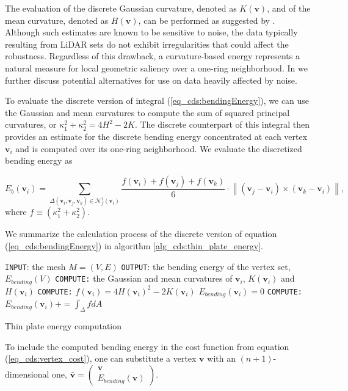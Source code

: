 \documentclass[graybox]{svmult}
\begin{document}
	
	The evaluation of the discrete Gaussian curvature, denoted as $K(\mathbf{v})$, and  of the mean curvature, denoted as $H(\mathbf{v})$, can be performed as suggested by \cite{Meyer2003}. Although such estimates are known to be sensitive to noise, the data typically resulting from LiDAR sets do not exhibit irregularities that could affect the robustness. Regardless of this drawback, a curvature-based energy represents a natural measure for local geometric saliency over a one-ring neighborhood. In \cite{Cioaca2016, Cioaca2016CEAI} we further discuss potential alternatives for use on data heavily affected by noise.
	
	To evaluate the discrete version of integral (\ref{eq_cds:bendingEnergy}), we can use the Gaussian and mean curvatures to compute the sum of squared principal curvatures, or $\kappa_1^2 + \kappa_2^2 = 4H^2 - 2K  $. The discrete counterpart of this integral then provides an estimate for the discrete bending energy concentrated at each vertex $\mathbf{v}_i$ and is computed over its one-ring neighborhood. We evaluate the discretized bending energy as 
	
	\begin{equation}
	\label{eq_cds:bendingEnergyDiscrete}
	E_{b}(\mathbf{{v}}_i) = \sum_{\Delta({\mathbf{{v}}_i,\mathbf{{v}}_j,\mathbf{{v}}_k}) \in \mathcal{N}_f^1(\mathbf{{v}}_i)} 
	\frac{f(\mathbf{{v}}_i) + f(\mathbf{{v}}_j) + f(\mathbf{{v}}_k)}{6} \cdot \left\lVert (\mathbf{{v}}_j - \mathbf{{v}}_i) \times (\mathbf{{v}}_k - \mathbf{{v}}_i) \right\rVert,
	\end{equation}
	where $f \equiv (\kappa_1^2 + \kappa_2^2)$.
	
	
	We summarize the calculation process of the discrete version of equation (\ref{eq_cds:bendingEnergy}) in algorithm \ref{alg_cds:thin_plate_energy}.
	
	\begin{algorithm}[t]
		\begin{algorithmic}
			\STATE \texttt{INPUT}: the mesh $M=(V,E)$
			\STATE \texttt{OUTPUT}: the bending energy of the vertex set, $E_{bending}(V)$
			\STATE \texttt{COMPUTE:} the Gaussian and mean curvatures of $\mathbf{v}_i$,
			$K(\mathbf{{v}}_i)$ and $H(\mathbf{{v}}_i)$
			\STATE \texttt{COMPUTE:} $f(\mathbf{v}_i) = 4H(\mathbf{{v}}_i)^2 - 2K(\mathbf{{v}}_i)$ 
			\ENDFOR
			\STATE $E_{bending}(\mathbf{{v}}_i) = 0$
			\STATE \texttt{COMPUTE:} $E_{bending}(\mathbf{v}_i) += \int_{\Delta }{f}dA$
			\ENDFOR
			\ENDFOR
		\end{algorithmic}
		\caption{Thin plate energy computation}
		\label{alg_cds:thin_plate_energy}
	\end{algorithm}
	To include the computed bending energy in the cost function from equation (\ref{eq_cds:vertex_cost}), one can substitute a vertex $\mathbf{v}$ with an $(n+1)$-dimensional one, $\mathbf{\bar{v}}=\begin{pmatrix}\mathbf{v} \\ E_{bending}(\mathbf{v})\end{pmatrix}$.
	
\end{document}
